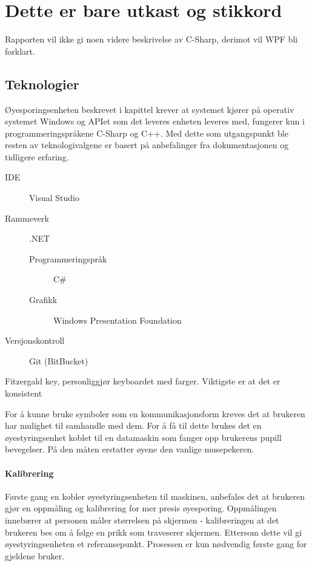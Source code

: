 \documentclass[phd,tocprelim]{cornell}
\begin{document}
\chapter{Dette er bare utkast og stikkord}

Rapporten vil ikke gi noen videre beskrivelse av C-Sharp, derimot vil WPF bli forklart.


\section{Teknologier}

Øyesporingsenheten beskrevet i kapittel  krever at systemet kjører på operativ systemet Windows og APIet som det leveres enheten leveres med,  fungerer kun i programmeringspråkene C-Sharp og C++. Med dette som utgangspunkt ble resten av teknologivalgene er basert på anbefalinger fra dokumentasjonen og tidligere erfaring. 


\begin{description}
  \item[IDE] Visual Studio
  \item[Rammeverk] .NET
  \begin{description}
     \item[Programmeringspråk] C\#
     \item[Grafikk] Windows Presentation Foundation 
\end{description}
  \item[Versjonskontroll] Git (BitBucket)
\end{description}


Fitzergald key, personliggjør keyboardet med farger. Viktigste er at det er konsistent


For å kunne bruke symboler som en kommunikasjonsform kreves det at brukeren har mulighet til samhandle med dem. For å få til dette brukes det en øyestyringsenhet koblet til en datamaskin som fanger opp brukerens pupill bevegelser. På den måten erstatter øyene den vanlige musepekeren.

\subsubsection{Kalibrering}


Første gang en kobler øyestyringsenheten til maskinen, anbefales det at brukeren gjør en oppmåling og kalibrering for mer presis øyesporing. Oppmålingen innebærer at personen måler størrelsen på skjermen - kalibreringen at det brukeren bes om å følge en prikk som traveserer skjermen. Ettersom dette vil gi øyestyringsenheten et referansepunkt. Prosessen er kun nødvendig første gang for gjeldene bruker. 
\end{document}
